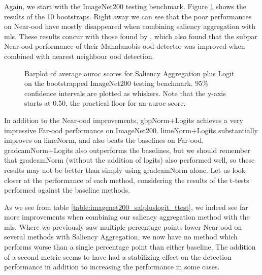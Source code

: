 \documentclass[UKenglish]{uiomasterthesis} %
\theoremstyle{definition}
\begin{document}
Again, we start with the ImageNet200 testing benchmark. Figure \ref{fig:imagenet200_salpluslogit_bootstrap_barplot} shows the results of the 10 bootstraps. Right away we can see that the poor performances on Near-\ac{ood} have mostly disappeared when combining saliency aggregation with \ac{mls}. These results concur with those found by \cite{combood}, which also found that the subpar Near-\ac{ood} performance of their Mahalanobis \ac{ood} detector was improved when combined with nearest neighbour \ac{ood} detection. 

\begin{figure}[H]
    \begin{center}
        
    \end{center}
    \caption[ImageNet200 Saliency Aggregation plus Logit Bootstrap]{Barplot of average \ac{auroc} scores for Saliency Aggregation plus Logit on the bootstrapped ImageNet200 testing benchmark. 95\% confidence intervals are plotted as whiskers. Note that the y-axis starts at 0.50, the practical floor for an \ac{auroc} score.}
    \label{fig:imagenet200_salpluslogit_bootstrap_barplot}
\end{figure}

In addition to the Near-\ac{ood} improvements, \ac{gbp}Norm+Logits achieves a very impressive Far-\ac{ood} performance on ImageNet200. \ac{lime}Norm+Logits substantially improves on \ac{lime}Norm, and also beats the baselines on Far-\ac{ood}. \ac{gradcam}Norm+Logits also outperforms the baselines, but we should remember that \ac{gradcam}Norm (without the addition of logits) also performed well, so these results may not be better than simply using \ac{gradcam}Norm alone. Let us look closer at the performance of each method, considering the results of the t-tests performed against the baseline methods.

As we see from table \ref{table:imagenet200_salpluslogit_ttest}, we indeed see far more improvements when combining our saliency aggregation method with the \ac{mls}. Where we previously saw multiple percentage points lower Near-\ac{ood} on several methods with Saliency Aggregation, we now have no method which performs worse than a single percentage point than either baseline. The addition of a second metric seems to have had a stabilizing effect on the detection performance in addition to increasing the performance in some cases.
\end{document}
